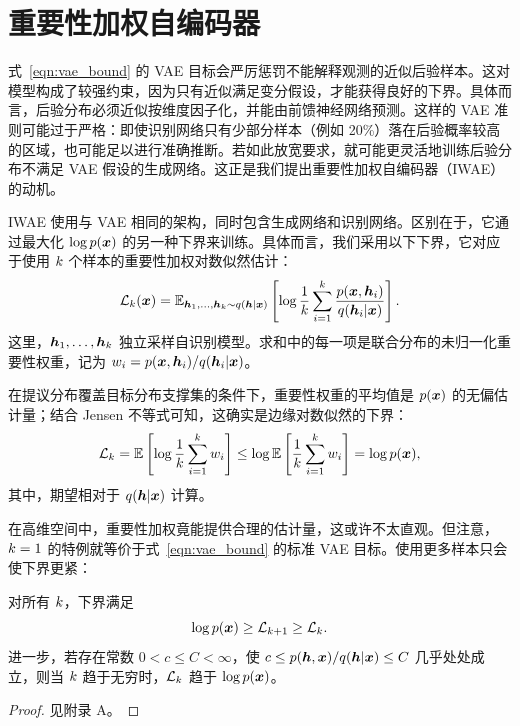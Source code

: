 \section{重要性加权自编码器}
\label{sec:iwae}

式~\eqref{eqn:vae_bound} 的 VAE 目标会严厉惩罚不能解释观测的近似后验样本。这对模型构成了较强约束，因为只有近似满足变分假设，才能获得良好的下界。具体而言，后验分布必须近似按维度因子化，并能由前馈神经网络预测。这样的 VAE 准则可能过于严格：即使识别网络只有少部分样本（例如 20\%）落在后验概率较高的区域，也可能足以进行准确推断。若如此放宽要求，就可能更灵活地训练后验分布不满足 VAE 假设的生成网络。这正是我们提出重要性加权自编码器（IWAE）的动机。

IWAE 使用与 VAE 相同的架构，同时包含生成网络和识别网络。区别在于，它通过最大化 $\log p(\bm{x})$ 的另一种下界来训练。具体而言，我们采用以下下界，它对应于使用 $k$ 个样本的重要性加权对数似然估计：
\begin{equation}
\mathcal{L}_{k}(\bm{x})=\mathbb{E}_{\bm{h}_{1},\ldots,\bm{h}_{k} \sim q(\bm{h} | \bm{x})} \left[ \log \frac{1}{k} \sum_{i=1}^k \frac{p(\bm{x},\bm{h}_{i})}{q(\bm{h}_{i}|\bm{x})} \right]. \label{eqn:is_bound}
\end{equation}
这里，$\bm{h}_{1},\ldots,\bm{h}_{k}$ 独立采样自识别模型。求和中的每一项是联合分布的未归一化重要性权重，记为 $w_{i}=p(\bm{x},\bm{h}_{i})/q(\bm{h}_{i}|\bm{x})$。

在提议分布覆盖目标分布支撑集的条件下，重要性权重的平均值是 $p(\bm{x})$ 的无偏估计量；结合 Jensen 不等式可知，这确实是边缘对数似然的下界：
\begin{equation}
\mathcal{L}_{k}=\mathbb{E} \left[ \log \frac{1}{k} \sum_{i=1}^k w_{i} \right] \leq \log \mathbb{E} \left[ \frac{1}{k} \sum_{i=1}^k w_{i} \right] =\log p(\bm{x}),\label{eq:source-09}
\end{equation}
其中，期望相对于 $q(\bm{h}|\bm{x})$ 计算。

在高维空间中，重要性加权竟能提供合理的估计量，这或许不太直观。但注意，$k=1$ 的特例就等价于式~\eqref{eqn:vae_bound} 的标准 VAE 目标。使用更多样本只会使下界更紧：
\begin{theorem}
对所有 $k$，下界满足
\begin{equation}
\log p(\bm{x}) \geq \mathcal{L}_{k + 1} \geq \mathcal{L}_{k}.\label{eq:source-10}
\end{equation}
进一步，若存在常数 $0<c\leq C<\infty$，使 $c\leq p(\bm{h},\bm{x})/q(\bm{h}|\bm{x})\leq C$ 几乎处处成立，则当 $k$ 趋于无穷时，$\mathcal{L}_{k}$ 趋于 $\log p(\bm{x})$。
\end{theorem}
\begin{proof}
见附录 A。
\end{proof}

